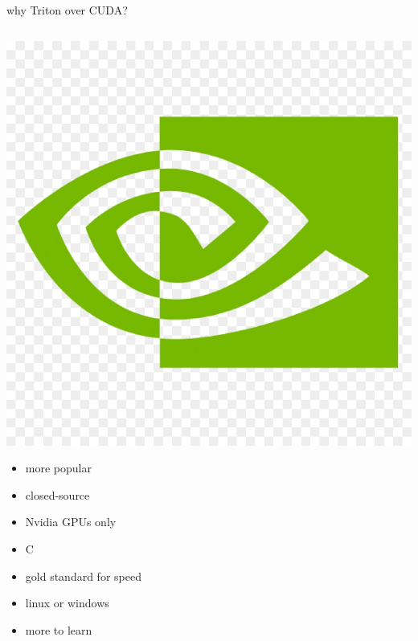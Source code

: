 \documentclass[aspectratio=169]{beamer}
\begin{document}
\begin{frame}{why Triton over CUDA?}
\begin{columns}[T]
\begin{column}[T]{0.4\textwidth}
        \includegraphics[height=0.2\textheight]{pics/nv256n5b1-nvidia-logo-nvidia-logo-free-icon-of-vector-logo-1502684034.jpeg}
        \begin{itemize}
            \item more popular
            \item closed-source
            \item Nvidia GPUs only
            \item C
            \item gold standard for speed
            \item linux or windows
            \item more to learn
            \end{itemize}
    \end{column}
\end{columns}
\end{frame}
\end{document}
